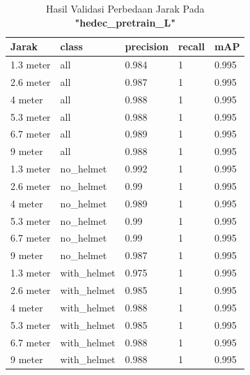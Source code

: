 \begin{enumerate}
  \begin{table}
    \centering
    \caption{Hasil Validasi Perbedaan Jarak Pada \textbf{"hedec\_pretrain\_L"}}
    \label{tb:hasiljarak_hedec_pretrain_L}
    \begin{tabular}{|l|l|l|l|l|} 
    \hline
    Jarak     & class        & precision & recall & mAP    \\ 
    \hline
    1.3 meter & all          & 0.984     & 1      & 0.995  \\
    2.6 meter & all          & 0.987     & 1      & 0.995  \\
    4 meter   & all          & 0.988     & 1      & 0.995  \\
    5.3 meter & all          & 0.988     & 1      & 0.995  \\
    6.7 meter & all          & 0.989     & 1      & 0.995  \\
    9 meter   & all          & 0.988     & 1      & 0.995  \\
    1.3 meter & no\_helmet   & 0.992     & 1      & 0.995  \\
    2.6 meter & no\_helmet   & 0.99      & 1      & 0.995  \\
    4 meter   & no\_helmet   & 0.989     & 1      & 0.995  \\
    5.3 meter & no\_helmet   & 0.99      & 1      & 0.995  \\
    6.7 meter & no\_helmet   & 0.99      & 1      & 0.995  \\
    9 meter   & no\_helmet   & 0.987     & 1      & 0.995  \\
    1.3 meter & with\_helmet & 0.975     & 1      & 0.995  \\
    2.6 meter & with\_helmet & 0.985     & 1      & 0.995  \\
    4 meter   & with\_helmet & 0.988     & 1      & 0.995  \\
    5.3 meter & with\_helmet & 0.985     & 1      & 0.995  \\
    6.7 meter & with\_helmet & 0.988     & 1      & 0.995  \\
    9 meter   & with\_helmet & 0.988     & 1      & 0.995  \\
    \hline
    \end{tabular}
  \end{table}


\end{enumerate}

